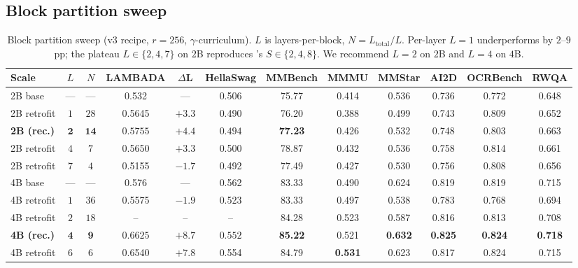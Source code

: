 \documentclass{article}
\begin{document}
\subsection{Block partition sweep}
\label{app:block_partition}
\begin{table}[h]
\caption{Block partition sweep (v3 recipe, $r{=}256$, $\gamma$-curriculum). $L$ is layers-per-block, $N{=}L_{\text{total}}/L$. Per-layer $L{=}1$ underperforms by $2$--$9$pp; the plateau $L\in\{2,4,7\}$ on $2$B reproduces \citet{chen2026attnres}'s $S\in\{2,4,8\}$. We recommend $L{=}2$ on $2$B and $L{=}4$ on $4$B.}
\label{tab:block_partition}
\centering\small
\setlength{\tabcolsep}{3pt}
\begin{tabular}{lccccccccccc}
\toprule
Scale & $L$ & $N$ & LAMBADA & $\Delta$L & HellaSwag & MMBench & MMMU & MMStar & AI2D & OCRBench & RWQA \\
\midrule
2B base       & --- & ---  & 0.532  & ---     & 0.506 & 75.77 & 0.414 & 0.536 & 0.736 & 0.772 & 0.648 \\
2B retrofit   & $1$ & $28$ & 0.5645 & $+3.3$  & 0.490 & 76.20 & 0.388 & 0.499 & 0.743 & 0.809 & 0.652 \\
\textbf{2B (rec.)} & $\mathbf{2}$ & $\mathbf{14}$ & $\mathbf{0.5755}$ & $\mathbf{+4.4}$ & $\mathbf{0.494}$ & \textbf{77.23} & 0.426 & 0.532 & 0.748 & 0.803 & 0.663 \\
2B retrofit   & $4$ & $7$  & 0.5650 & $+3.3$  & 0.500 & 78.87 & 0.432 & 0.536 & 0.758 & 0.814 & 0.661 \\
2B retrofit   & $7$ & $4$  & 0.5155 & $-1.7$  & 0.492 & 77.49 & 0.427 & 0.530 & 0.756 & 0.808 & 0.656 \\
\midrule
4B base       & --- & ---  & 0.576  & ---     & 0.562 & 83.33 & 0.490 & 0.624 & 0.819 & 0.819 & 0.715 \\
4B retrofit   & $1$ & $36$ & 0.5575 & $-1.9$  & 0.523 & 83.33 & 0.497 & 0.538 & 0.783 & 0.768 & 0.694 \\
4B retrofit   & $2$ & $18$ & --     & --      & --    & 84.28 & 0.523 & 0.587 & 0.816 & 0.813 & 0.708 \\
\textbf{4B (rec.)} & $\mathbf{4}$ & $\mathbf{9}$ & $\mathbf{0.6625}$ & $\mathbf{+8.7}$ & $\mathbf{0.552}$ & \textbf{85.22} & 0.521 & \textbf{0.632} & \textbf{0.825} & \textbf{0.824} & \textbf{0.718} \\
4B retrofit   & $6$ & $6$  & 0.6540 & $+7.8$  & 0.554 & 84.79 & \textbf{0.531} & 0.623 & 0.817 & 0.824 & 0.715 \\
\bottomrule
\end{tabular}
\end{table}
\end{document}

